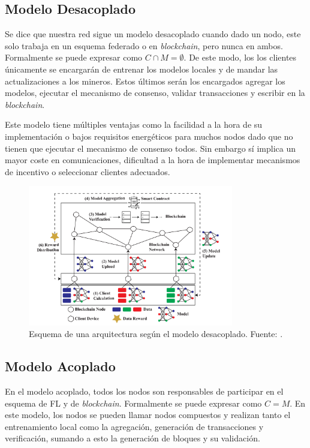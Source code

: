 \subsection{Modelo Desacoplado}
Se dice que nuestra red sigue un modelo desacoplado cuando dado un nodo, este solo trabaja en un esquema federado o en \textit{blockchain}, pero nunca en ambos. Formalmente se puede expresar como $C \cap M = \emptyset$. De este modo, los los clientes únicamente se encargarán de entrenar los modelos locales y de mandar las actualizaciones a los mineros. Estos últimos serán los encargados agregar los modelos, ejecutar el mecanismo de consenso, validar transacciones y escribir en la \textit{blockchain}. 

Este modelo tiene múltiples ventajas como la facilidad a la hora de su implementación o bajos requisitos energéticos para muchos nodos dado que no tienen que ejecutar el mecanismo de consenso todos. Sin embargo sí implica un mayor coste en comunicaciones, dificultad a la hora de implementar mecanismos de incentivo o seleccionar clientes adecuados.
\begin{figure}[h]
	\centering
	\includegraphics[width=0.8\textwidth]{figuras/decoupled.png}
	\caption{Esquema de una arquitectura según el modelo desacoplado. Fuente: \cite{zhu-2023-blockfed}.}
	\label{fig:decoupled}
\end{figure}

\subsection{Modelo Acoplado}
En el modelo acoplado, todos los nodos son responsables de participar en el esquema de \ac{FL} y de \textit{blockchain}. Formalmente se puede expresar como $C=M$. En este modelo, los nodos se pueden llamar nodos compuestos y realizan tanto el entrenamiento local como la agregación, generación de transacciones y verificación, sumando a esto la generación de bloques y su validación. 

